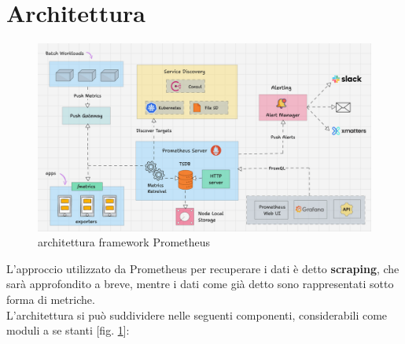 \section{Architettura}
\begin{figure} [ht]
    \centering
    \includegraphics[width=1\linewidth]{UNINA_BSc_Final_Report//img//explanation/prometheus-architecture.png}
    \caption{architettura framework Prometheus \cite{Prometheus-architecture}}
    \label{fig:prometheus-architecture}
\end{figure}
L'approccio utilizzato da Prometheus per recuperare i dati è detto \textbf{scraping}, che sarà approfondito a breve, mentre i dati come già detto sono rappresentati sotto forma di metriche.\\ 
L'architettura si può suddividere nelle seguenti componenti, considerabili come moduli a se stanti [fig. \ref{fig:prometheus-architecture}]: \\

